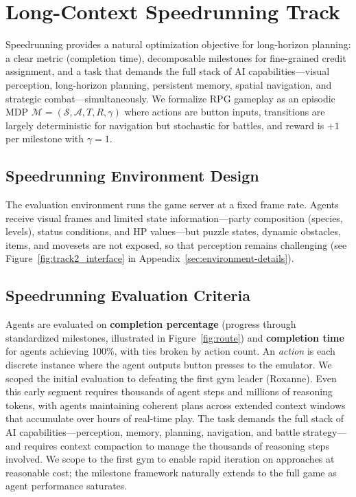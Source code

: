 \section{Long-Context Speedrunning Track}
\label{sec:track2}

Speedrunning provides a natural optimization objective for long-horizon planning: a clear metric (completion time), decomposable milestones for fine-grained credit assignment, and a task that demands the full stack of AI capabilities---visual perception, long-horizon planning, persistent memory, spatial navigation, and strategic combat---simultaneously. We formalize RPG gameplay as an episodic MDP $\mathcal{M} = (\mathcal{S}, \mathcal{A}, T, R, \gamma)$ where actions are button inputs, transitions are largely deterministic for navigation but stochastic for battles, and reward is $+1$ per milestone with $\gamma = 1$.

\subsection{Speedrunning Environment Design}

The evaluation environment runs the game server at a fixed frame rate. Agents receive visual frames and limited state information---party composition (species, levels), status conditions, and HP values---but puzzle states, dynamic obstacles, items, and movesets are not exposed, so that perception remains challenging (see Figure~\ref{fig:track2_interface} in Appendix~\ref{sec:environment-details}).

\subsection{Speedrunning Evaluation Criteria}

Agents are evaluated on \textbf{completion percentage} (progress through standardized milestones, illustrated in Figure~\ref{fig:route}) and \textbf{completion time} for agents achieving 100\%, with ties broken by action count. An \textit{action} is each discrete instance where the agent outputs button presses to the emulator. We scoped the initial evaluation to defeating the first gym leader (Roxanne). Even this early segment requires thousands of agent steps and millions of reasoning tokens, with agents maintaining coherent plans across extended context windows that accumulate over hours of real-time play. The task demands the full stack of AI capabilities---perception, memory, planning, navigation, and battle strategy---and requires context compaction to manage the thousands of reasoning steps involved. We scope to the first gym to enable rapid iteration on approaches at reasonable cost; the milestone framework naturally extends to the full game as agent performance saturates.

